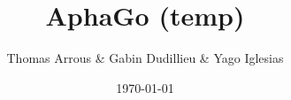 \documentclass{beamer}
\begin{document}
	
	
		\title{AphaGo (temp)}
            \author{Thomas Arrous & Gabin Dudillieu & Yago Iglesias}	
            \date{\today}
		\maketitle

		\tableofcontents
\end{document}
